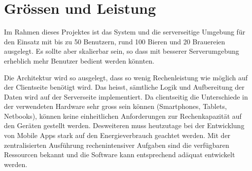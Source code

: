 \documentclass[10pt,a4paper]{scrartcl}
\begin{document}
\section{Grössen und Leistung}

Im Rahmen dieses Projektes ist das System und die serverseitige Umgebung für den
Einsatz mit bis zu 50 Benutzern, rund 100 Bieren und 20 Brauereien ausgelegt.
Es sollte aber skalierbar sein, so dass mit besserer Serverumgebung erheblich
mehr Benutzer bedient werden könnten.

Die Architektur wird so ausgelegt, dass so wenig Rechenleistung wie möglich auf der Clientseite
benötigt wird. Das heisst, sämtliche Logik und Aufbereitung der Daten wird auf der Serverseite
implementiert. Da clientseitig die Unterschiede in der verwendeten Hardware sehr gross sein
können (Smartphones, Tablets, Netbooks), können keine einheitlichen Anforderungen zur
Rechenkapazität auf den Geräten gestellt werden. Desweiteren muss heutzutage bei der Entwicklung
von Mobile Apps stark auf den Energieverbrauch geachtet werden. Mit der zentralisierten Ausführung
rechenintensiver Aufgaben sind die verfügbaren Ressourcen bekannt und die Software kann entsprechend
adäquat entwickelt werden.
\end{document}

